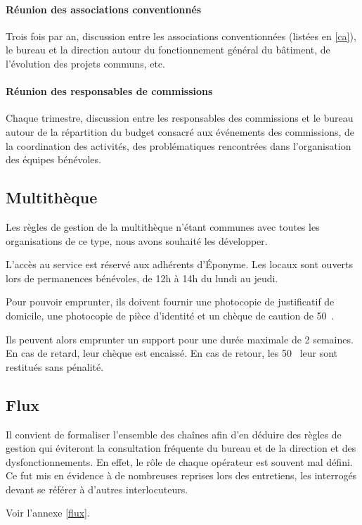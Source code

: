 \paragraph{Réunion des associations conventionnés} Trois fois par an,
discussion entre les associations conventionnées (listées en \ref{ca}),
le bureau et la direction autour du fonctionnement général du bâtiment,
de l'évolution des projets communs, etc.

\paragraph{Réunion des responsables de commissions} Chaque trimestre,
discussion entre les responsables des commissions et le bureau
autour de la répartition du budget consacré aux événements des commissions,
de la coordination des activités, des problématiques rencontrées dans
l'organisation des équipes bénévoles.

\subsection{Multithèque}
\label{multitheque}

Les règles de gestion de la multithèque n'étant communes avec toutes les
organisations de ce type, nous avons souhaité les développer.

L'accès au service est réservé aux adhérents d'Éponyme. Les locaux sont ouverts
lors de permanences bénévoles, de 12h à 14h du lundi au jeudi.

Pour pouvoir emprunter, ils doivent fournir une photocopie de justificatif de domicile,
une photocopie de pièce d'identité et un chèque de caution de 50~{\texteuro}.

Ils peuvent alors emprunter un support pour une durée maximale de 2 semaines.
En cas de retard, leur chèque est encaissé. En cas de retour, les 50~{\texteuro}
leur sont restitués sans pénalité.

\subsection{Flux}

Il convient de formaliser l'ensemble des chaînes afin d'en déduire des règles
de gestion qui éviteront la consultation fréquente du bureau et de la direction
et des dysfonctionnements. En effet, le rôle de chaque opérateur est souvent
mal défini. Ce fut mis en évidence à de nombreuses reprises lors des entretiens,
les interrogés devant se référer à d'autres interlocuteurs.

Voir l'annexe \ref{flux}.